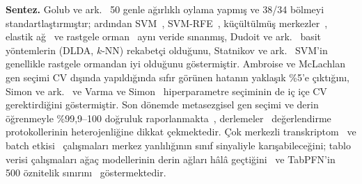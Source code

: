 \documentclass[conference]{IEEEtran}
\begin{document}
\textbf{Sentez.} Golub ve ark.~\cite{golub1999} 50 genle ağırlıklı oylama yapmış ve 38/34 bölmeyi standartlaştırmıştır; ardından SVM~\cite{furey2000}, SVM-RFE~\cite{guyon2002}, küçültülmüş merkezler~\cite{tibshirani2002}, elastik ağ~\cite{zou2005} ve rastgele orman~\cite{diaz2006} aynı veride sınanmış, Dudoit ve ark.~\cite{dudoit2002} basit yöntemlerin (DLDA, $k$-NN) rekabetçi olduğunu, Statnikov ve ark.~\cite{statnikov2008} SVM'in genellikle rastgele ormandan iyi olduğunu göstermiştir. Ambroise ve McLachlan~\cite{ambroise2002} gen seçimi CV dışında yapıldığında sıfır görünen hatanın yaklaşık \%5'e çıktığını, Simon ve ark.~\cite{simon2003} ve Varma ve Simon~\cite{varma2006} hiperparametre seçiminin de iç içe CV gerektirdiğini göstermiştir. Son dönemde metasezgisel gen seçimi ve derin öğrenmeyle \%99,9--100 doğruluk raporlanmakta~\cite{nagra2024,rupapara2022,alabdulqader2024,ilyas2023,rahaman2025}, derlemeler~\cite{alhenawi2022,alharbi2023} değerlendirme protokollerinin heterojenliğine dikkat çekmektedir. Çok merkezli transkriptom~\cite{warnat2020,warnat2021} ve batch etkisi~\cite{leek2010,johnson2007} çalışmaları merkez yanlılığının sınıf sinyaliyle karışabileceğini; tablo verisi çalışmaları ağaç modellerinin derin ağları hâlâ geçtiğini~\cite{grinsztajn2022} ve TabPFN'in~\cite{hollmann2025} 500 öznitelik sınırını~\cite{zhou2025} göstermektedir.
\end{document}
